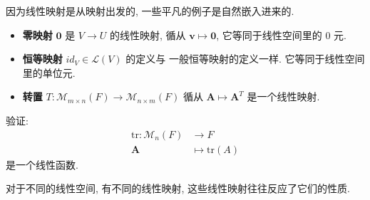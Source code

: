\documentclass[UTF8]{book}
\begin{document}
因为线性映射是从映射出发的, 一些平凡的例子是自然嵌入进来的. 

\begin{example}
    \begin{itemize}
        \item \textbf{零映射} $\boldsymbol{0}$ 是 $V\to U$ 的线性映射, 
        循从 $\boldsymbol{v} \mapsto \boldsymbol{0}$, 它等同于线性空间里的
        0 元. 
        
        \item \textbf{恒等映射} $id_V \in \mathcal{L}(V)$ 的定义与
        一般恒等映射的定义一样. 它等同于线性空间里的单位元. 
        
        \item \textbf{转置} 
        $T: \mathcal{M}_{m\times n}(F) \to \mathcal{M}_{n\times m}(F)$ 
        循从 $\boldsymbol{A} \mapsto \boldsymbol{A}^T$ 是一个线性映射. 
    \end{itemize}
\end{example}

\begin{exercise}
    验证: 
    $$\begin{aligned}
        \mathrm{tr}: \mathcal{M}_{n}(F) &\to F \\
        \boldsymbol{A} &\mapsto \mathrm{tr}(A)
    \end{aligned}$$
    是一个线性函数. 
\end{exercise}

对于不同的线性空间, 有不同的线性映射, 这些线性映射往往反应了它们的性质. 
\end{document}
